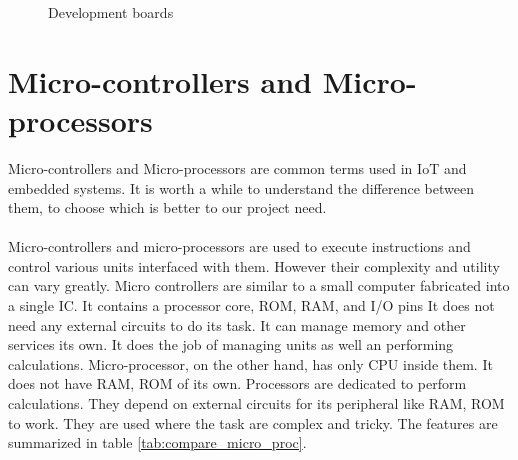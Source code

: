 \begin{figure}
    \centering
    \caption{Development boards}
\end{figure}

\section{Micro-controllers and Micro-processors}
Micro-controllers and Micro-processors are common terms used in \ac{IoT} and embedded systems. It is worth a while to understand the difference between them, to choose which is better to our project need.
\paragraph{ } Micro-controllers and micro-processors are used to execute instructions and control various units interfaced with them. However their complexity and utility can vary greatly. Micro controllers are similar to a small computer fabricated into a single \ac{IC}. It contains a processor core, ROM, RAM, and I/O pins It does not need any external circuits to do its task. It can manage memory and other services its own. It does the job of managing units as well an performing calculations. Micro-processor, on the other hand, has only CPU inside them. It does not have RAM, ROM of its own. Processors are dedicated to perform calculations. They depend on external circuits for its peripheral like RAM, ROM to work. They are used where the task are complex and tricky. The features are summarized in table \ref{tab:compare_micro_proc}.


